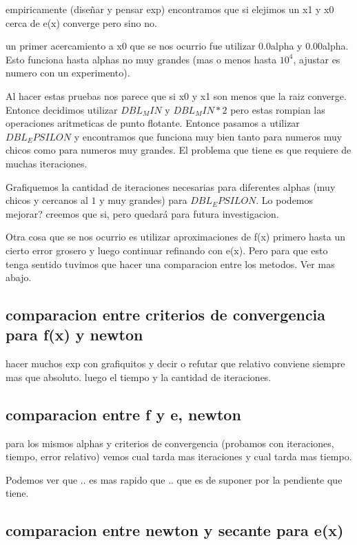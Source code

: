 \documentclass[10pt,a4paper]{article}
\begin{document}

empiricamente (diseñar y pensar exp) encontramos que si elejimos un x1 y x0
cerca de e(x) converge pero sino no.

un primer acercamiento a x0 que se nos ocurrio fue utilizar 0.0alpha y
0.00alpha. Esto funciona hasta alphas no muy grandes (mas o menos hasta $10^4$,
ajustar es numero con un experimento).

Al hacer estas pruebas nos parece que si x0 y x1 son menos que la raiz
converge. Entonce decidimos utilizar $DBL_MIN$ y $DBL_MIN * 2$ pero estas rompian
las operaciones aritmeticas de punto flotante. Entonce pasamos a utilizar
$DBL_EPSILON$ y encontramos que funciona muy bien tanto para numeros muy chicos
como para numeros muy grandes. El problema que tiene es que requiere de muchas
iteraciones.

Grafiquemos la cantidad de iteraciones necesarias para diferentes alphas (muy
chicos y cercanos al $1$ y muy grandes) para $DBL_EPSILON$. Lo podemos mejorar?
creemos que si, pero quedará para futura investigacion.

Otra cosa que se nos ocurrio es utilizar aproximaciones de f(x) primero hasta
un cierto error grosero y luego continuar refinando con e(x). Pero para que
esto tenga sentido tuvimos que hacer una comparacion entre los metodos. Ver mas
abajo.

\subsection{comparacion entre criterios de convergencia para f(x) y newton}

hacer muchos exp con grafiquitos y decir o refutar que relativo conviene
siempre mas que absoluto. luego el tiempo y la cantidad de iteraciones.

\subsection{comparacion entre f y e, newton}

para los mismos alphas y criterios de convergencia (probamos con iteraciones,
tiempo, error relativo) vemos cual tarda mas iteraciones y cual tarda mas
tiempo.

Podemos ver que .. es mas rapido que .. que es de suponer por la pendiente que
tiene.

\subsection{comparacion entre newton y secante para e(x)}
\end{document}
